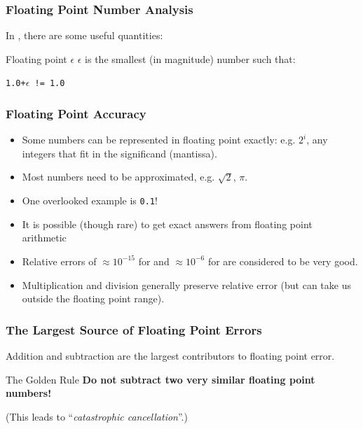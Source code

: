 \documentclass[smaller,table]{beamer}
\begin{document}
\begin{frame}
\frametitle{Floating Point Number Analysis}
In , there are some useful quantities:

\begin{block}{Floating point $\epsilon$}
$\epsilon$ is the smallest (in magnitude) number such that:\\
\begin{center}
{\tt 1.0+$\epsilon$ != 1.0}
\end{center}
\end{block}
\end{frame}

\begin{frame}
\frametitle{Floating Point Accuracy}
\begin{itemize}
\item Some numbers can be represented in floating point exactly:
e.g. $2^i$, any integers that fit in the significand (mantissa).
\item Most numbers need to be approximated, e.g. $\sqrt{2}$, $\pi$.
\item One overlooked example is {\tt0.1}!
\item It is possible (though rare) to get exact answers from floating point arithmetic
\item Relative errors of $\approx10^{-15}$ for  and
$\approx10^{-6}$ for  are considered to be very good.
\item Multiplication and division generally preserve relative error (but can take us outside the floating point range).
\end{itemize}
\end{frame}

\begin{frame}
\frametitle{The Largest Source of Floating Point Errors}
Addition and subtraction are the largest contributors to floating point error.

\begin{alertblock}{The Golden Rule}
{\bf Do not subtract two very similar floating point numbers!}
\end{alertblock}

(This leads to ``\emph{catastrophic cancellation}''.)
\end{frame}
\end{document}
